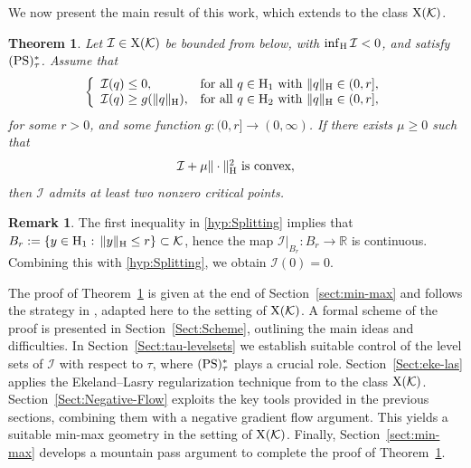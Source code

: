 \documentclass{article}
\newcommand{\boK}{\mathcal{K}}
\newcommand{\boI}{\mathcal{I}}
\newcommand{\R}{\mathbb{R}}
\newcommand{\Hilb}{{\textnormal H}}
\newcommand{\X}{{\textnormal X}}
\newcommand{\PS}{(\textnormal{PS})^{*}_\tau}
\newtheorem{theorem}{Theorem}[section]
\theoremstyle{definition}
\newtheorem{remark}{Remark}[section]
\begin{document}
    

We now present the main result of this work, which extends \cite[Theorem 4]{Bre-Nir} to the class $\X(\boK)$.

\begin{theorem}\label{MainTheorem}
Let $\boI \in \X(\boK)$ be bounded from below,  with $\inf_{\Hilb} \boI < 0$, and satisfy $\PS$. Assume that
\begin{equation}\label{hyp:Splitting}
\left\{\begin{array}{ll}
\boI(q)\leq0,&\hbox{for all }q\in\Hilb_1\ \hbox{with }\|q\|_\Hilb\in(0,r],\\
\boI(q)\geq g(\|q\|_\Hilb),&\hbox{for all }q\in\Hilb_2\ \hbox{with }\|q\|_\Hilb\in(0,r],
\end{array}\right.
\end{equation}
for some $r>0$, and some function $g : (0,r] \to (0,\infty)$. If there exists $\mu \geq 0$ such that 
\begin{equation}\label{hyp:convex}
		\hbox{$\boI + \mu\|\cdot\|_\Hilb^2$}\text{ is convex},
\end{equation}
then $\boI$ admits at least two nonzero critical points.
\end{theorem}


\begin{remark}\label{rem:I(0)}
The first inequality in \eqref{hyp:Splitting} implies that $B_{r}:=\{y\in\Hilb_1:\, \|y\|_\Hilb\leq r\}\subset\boK$, hence the map $\boI|_{B_{r}}:B_r\to\R$ is continuous. Combining this with \eqref{hyp:Splitting}, we obtain $\boI(0)=0$. 
\end{remark}

The proof of Theorem~\ref{MainTheorem} is given at the end of Section~\ref{sect:min-max} and follows the strategy in \cite[Theorem 4]{Bre-Nir}, adapted here to the setting of $\X(\boK)$. A formal scheme of the proof is presented in Section~\ref{Sect:Scheme},  outlining the main ideas and difficulties. In Section~\ref{Sect:tau-levelsets} we establish suitable control of the level sets of $\boI$ with respect to $\tau$, where $\PS$ plays a crucial role. Section~\ref{Sect:eke-las} applies the Ekeland–Lasry regularization technique from \cite{Eke-Las} to the class $\X(\boK)$. Section~\ref{Sect:Negative-Flow} exploits the key tools provided in the previous sections, combining them with a negative gradient flow argument. This yields a suitable min-max geometry in the setting of $\X(\boK)$. Finally, Section~\ref{sect:min-max} develops a mountain pass argument to complete the proof of Theorem~\ref{MainTheorem}.
 
\end{document}

